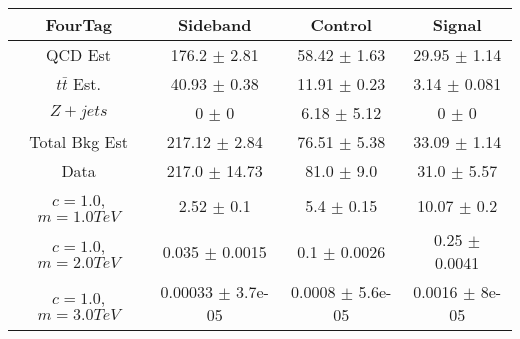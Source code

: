 \begin{footnotesize} 
\begin{tabular}{c|c|c|c} 
FourTag & Sideband & Control & Signal \\ 
\hline\hline 
QCD Est & 176.2 $\pm$ 2.81 & 58.42 $\pm$ 1.63 & 29.95 $\pm$ 1.14\\ 
$t\bar{t}$ Est.  & 40.93 $\pm$ 0.38 & 11.91 $\pm$ 0.23 & 3.14 $\pm$ 0.081\\ 
$Z+jets$ & 0 $\pm$ 0 & 6.18 $\pm$ 5.12 & 0 $\pm$ 0\\ 
Total Bkg Est & 217.12 $\pm$ 2.84 & 76.51 $\pm$ 5.38 & 33.09 $\pm$ 1.14\\ 
Data & 217.0 $\pm$ 14.73 & 81.0 $\pm$ 9.0 & 31.0 $\pm$ 5.57\\ 
$c=1.0$,$m=1.0TeV$ & 2.52 $\pm$ 0.1 & 5.4 $\pm$ 0.15 & 10.07 $\pm$ 0.2\\ 
$c=1.0$,$m=2.0TeV$ & 0.035 $\pm$ 0.0015 & 0.1 $\pm$ 0.0026 & 0.25 $\pm$ 0.0041\\ 
$c=1.0$,$m=3.0TeV$ & 0.00033 $\pm$ 3.7e-05 & 0.0008 $\pm$ 5.6e-05 & 0.0016 $\pm$ 8e-05\\ 
\hline\hline 
\end{tabular} 
\end{footnotesize} 
\newline 
